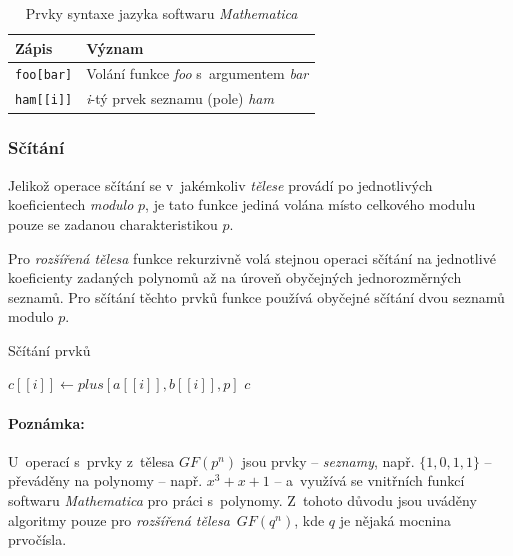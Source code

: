 \documentclass[thesis=M,czech,hidelinks]{FITthesis}[2012/06/26]
\newcommand{\0}{{\textcolor[gray]{0.75}{0}}}
\newenvironment{algoritmus}{
    \floatname{algorithm}{Algoritmus}
    \begin{algorithm}
}{\end{algorithm}}
\begin{document}
\begin{table}[!ht]
    \centering
    \begin{tabular}{l  l}
        Zápis               & Význam                                            \\
        \hline
        \texttt{foo[bar]}   & Volání funkce \emph{foo} s~argumentem \emph{bar}  \\
        \texttt{ham[[i]]}   & \emph{i}-tý prvek seznamu (pole) \emph{ham}       \\
    \end{tabular}
    \caption[Syntaxe Wolfram Mathematica]{
        Prvky syntaxe jazyka softwaru \emph{Mathematica}
    }
\end{table}


\subsubsection{Sčítání}

Jelikož operace sčítání se v~jakémkoliv \emph{tělese} provádí po jednotlivých
koeficientech \emph{modulo} $p$, je tato funkce jediná volána místo celkového
modulu pouze se zadanou charakteristikou $p$.

Pro \emph{rozšířená tělesa} funkce rekurzivně volá stejnou operaci sčítání na
jednotlivé koeficienty zadaných polynomů až na úroveň obyčejných jednorozměrných
seznamů. Pro sčítání těchto prvků funkce používá obyčejné sčítání dvou seznamů
modulo $p$.

\begin{algoritmus}[!ht]
    \caption{Sčítání prvků}
    \begin{algorithmic}[1]
            \State $c[[i]] \gets plus[a[[i]],b[[i]],p]$
        \EndFor
        \State \Return $c$
     \EndFunction
    \end{algorithmic}
\end{algoritmus}

\vfil


\paragraph{Poznámka:} U~operací s~prvky z~tělesa $GF(p^n)$ jsou prvky --
\emph{seznamy}, např. $\{1,0,1,1\}$ -- převáděny na polynomy -- např. $x^3+x+1$
-- a~využívá se vnitřních funkcí softwaru \emph{Mathematica} pro práci
s~polynomy. Z~tohoto důvodu jsou uváděny algoritmy pouze pro \emph{rozšířená
tělesa}~$GF(q^n)$, kde $q$ je nějaká mocnina prvočísla.
\end{document}
